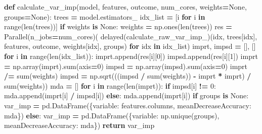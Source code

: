 \documentclass[
  11pt,
  oneside]{book}
\newenvironment{Shaded}{\begin{snugshade}}{\end{snugshade}}
\newcommand{\BuiltInTok}[1]{#1}
\newcommand{\ControlFlowTok}[1]{\textcolor[rgb]{0.13,0.29,0.53}{\textbf{#1}}}
\newcommand{\DecValTok}[1]{\textcolor[rgb]{0.00,0.00,0.81}{#1}}
\newcommand{\KeywordTok}[1]{\textcolor[rgb]{0.13,0.29,0.53}{\textbf{#1}}}
\newcommand{\NormalTok}[1]{#1}
\newcommand{\OperatorTok}[1]{\textcolor[rgb]{0.81,0.36,0.00}{\textbf{#1}}}
\newcommand{\StringTok}[1]{\textcolor[rgb]{0.31,0.60,0.02}{#1}}
\newcommand{\VariableTok}[1]{\textcolor[rgb]{0.00,0.00,0.00}{#1}}
\begin{document}
\begin{Shaded}
\begin{Highlighting}[]
\KeywordTok{def}\NormalTok{ calculate\_var\_imp(model, features, outcome, num\_cores, weights}\OperatorTok{=}\VariableTok{None}\NormalTok{, groups}\OperatorTok{=}\VariableTok{None}\NormalTok{):}
\NormalTok{    trees }\OperatorTok{=}\NormalTok{ model.estimators\_}
\NormalTok{    idx\_list }\OperatorTok{=}\NormalTok{ [i }\ControlFlowTok{for}\NormalTok{ i }\KeywordTok{in} \BuiltInTok{range}\NormalTok{(}\BuiltInTok{len}\NormalTok{(trees))]}
    \ControlFlowTok{if}\NormalTok{ weights }\KeywordTok{is} \VariableTok{None}\NormalTok{:}
\NormalTok{        weights }\OperatorTok{=}\NormalTok{ np.ones(}\BuiltInTok{len}\NormalTok{(trees))}
\NormalTok{    res }\OperatorTok{=}\NormalTok{ Parallel(n\_jobs}\OperatorTok{=}\NormalTok{num\_cores)(}
\NormalTok{      delayed(calculate\_raw\_var\_imp\_)(idx, trees[idx], features, outcome, weights[idx], groups) }\ControlFlowTok{for}\NormalTok{ idx }\KeywordTok{in}\NormalTok{ idx\_list)}
\NormalTok{    imprt, impsd }\OperatorTok{=}\NormalTok{ [], []}
    \ControlFlowTok{for}\NormalTok{ i }\KeywordTok{in} \BuiltInTok{range}\NormalTok{(}\BuiltInTok{len}\NormalTok{(idx\_list)):}
\NormalTok{        imprt.append(res[i][}\DecValTok{0}\NormalTok{])}
\NormalTok{        impsd.append(res[i][}\DecValTok{1}\NormalTok{])}
\NormalTok{    imprt }\OperatorTok{=}\NormalTok{ np.array(imprt).}\BuiltInTok{sum}\NormalTok{(axis}\OperatorTok{=}\DecValTok{0}\NormalTok{)}
\NormalTok{    impsd }\OperatorTok{=}\NormalTok{ np.array(impsd).}\BuiltInTok{sum}\NormalTok{(axis}\OperatorTok{=}\DecValTok{0}\NormalTok{)}
\NormalTok{    imprt }\OperatorTok{/=} \BuiltInTok{sum}\NormalTok{(weights)}
\NormalTok{    impsd }\OperatorTok{=}\NormalTok{ np.sqrt(((impsd }\OperatorTok{/} \BuiltInTok{sum}\NormalTok{(weights)) }\OperatorTok{{-}}\NormalTok{ imprt }\OperatorTok{*}\NormalTok{ imprt) }\OperatorTok{/} \BuiltInTok{sum}\NormalTok{(weights))}
\NormalTok{    mda }\OperatorTok{=}\NormalTok{ []}
    \ControlFlowTok{for}\NormalTok{ i }\KeywordTok{in} \BuiltInTok{range}\NormalTok{(}\BuiltInTok{len}\NormalTok{(imprt)):}
        \ControlFlowTok{if}\NormalTok{ impsd[i] }\OperatorTok{!=} \DecValTok{0}\NormalTok{:}
\NormalTok{            mda.append(imprt[i] }\OperatorTok{/}\NormalTok{ impsd[i])}
        \ControlFlowTok{else}\NormalTok{:}
\NormalTok{            mda.append(imprt[i])}
    \ControlFlowTok{if}\NormalTok{ groups }\KeywordTok{is} \VariableTok{None}\NormalTok{:}
\NormalTok{        var\_imp }\OperatorTok{=}\NormalTok{ pd.DataFrame(\{}\StringTok{\textquotesingle{}variable\textquotesingle{}}\NormalTok{: features.columns, }\StringTok{\textquotesingle{}meanDecreaseAccuracy\textquotesingle{}}\NormalTok{: mda\})}
    \ControlFlowTok{else}\NormalTok{: }
\NormalTok{        var\_imp }\OperatorTok{=}\NormalTok{ pd.DataFrame(\{}\StringTok{\textquotesingle{}variable\textquotesingle{}}\NormalTok{: np.unique(groups), }\StringTok{\textquotesingle{}meanDecreaseAccuracy\textquotesingle{}}\NormalTok{: mda\})}
    \ControlFlowTok{return}\NormalTok{ var\_imp}
\end{Highlighting}
\end{Shaded}
\end{document}
